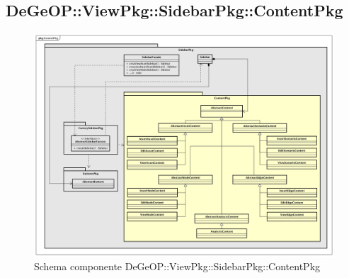 \subsection{DeGeOP::ViewPkg::SidebarPkg::ContentPkg}
\label{pkg::ContentPkg}
\begin{figure}[H]
	\centering
	\includegraphics[width=\textwidth]{img/PkgDiagram/STContentPkg.png}
	\caption{Schema componente DeGeOP::ViewPkg::SidebarPkg::ContentPkg}
\end{figure}
